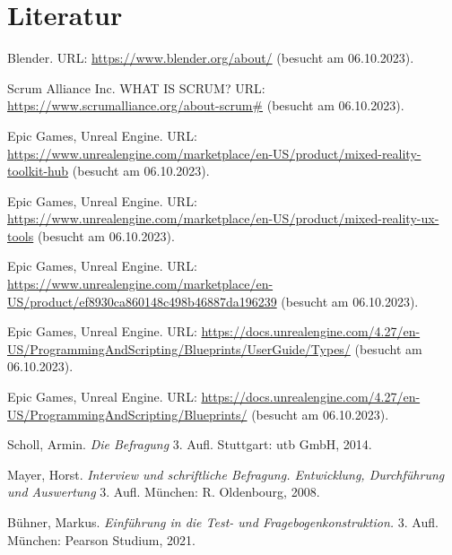 \chapter{Literatur}

\begin{sloppypar}
    Blender. URL: \url{https://www.blender.org/about/}
    (besucht am 06.10.2023).
\end{sloppypar}

\begin{sloppypar}
    Scrum Alliance Inc.
    WHAT IS SCRUM? URL: \url{https://www.scrumalliance.org/about-scrum#}
    (besucht am 06.10.2023).
\end{sloppypar}

\begin{sloppypar}
    Epic Games, Unreal Engine.
    URL: \url{https://www.unrealengine.com/marketplace/en-US/product/mixed-reality-toolkit-hub}
    (besucht am 06.10.2023).
\end{sloppypar}

\begin{sloppypar}
    Epic Games, Unreal Engine.
    URL: \url{https://www.unrealengine.com/marketplace/en-US/product/mixed-reality-ux-tools}
    (besucht am 06.10.2023).
\end{sloppypar}

\begin{sloppypar}
    Epic Games, Unreal Engine.
    URL: \url{https://www.unrealengine.com/marketplace/en-US/product/ef8930ca860148c498b46887da196239}
    (besucht am 06.10.2023).
\end{sloppypar}

\begin{sloppypar}
    Epic Games, Unreal Engine.
    URL: \url{https://docs.unrealengine.com/4.27/en-US/ProgrammingAndScripting/Blueprints/UserGuide/Types/}
    (besucht am 06.10.2023).
\end{sloppypar}

\begin{sloppypar}
    Epic Games, Unreal Engine.
    URL: \url{https://docs.unrealengine.com/4.27/en-US/ProgrammingAndScripting/Blueprints/}
    (besucht am 06.10.2023).
\end{sloppypar}


\begin{sloppypar}
    Scholl, Armin. \textit{Die Befragung} 3. Aufl. Stuttgart: utb GmbH, 2014.
\end{sloppypar}

\begin{sloppypar}
    Mayer, Horst. \textit{Interview und schriftliche Befragung. Entwicklung, Durchführung und Auswertung} 3. Aufl. München: R. Oldenbourg, 2008.
\end{sloppypar}

\begin{sloppypar}
    Bühner, Markus. \textit{Einführung in die Test- und Fragebogenkonstruktion.} 3. Aufl. München: Pearson Studium, 2021.
\end{sloppypar}